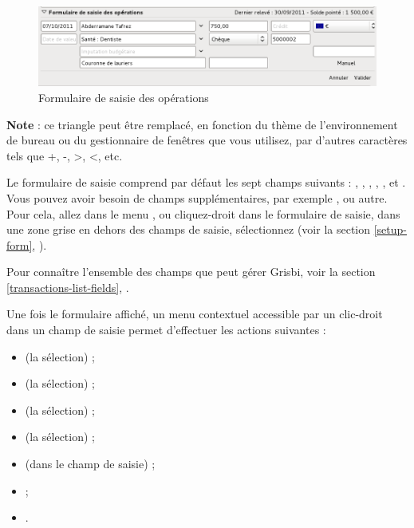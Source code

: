 \ifIllustration
\begin{figure}[htbp]
\begin{center}
\includegraphics[scale=0.5]{image/screenshot/transactions_form}
\end{center}
\caption{Formulaire de saisie des opérations}
\label{transactions-form-img}
\end{figure}
\fi

\textbf{Note} : ce triangle peut être remplacé, en fonction du thème de l'environnement de bureau ou du gestionnaire de fenêtres que vous utilisez, par d'autres caractères tels que +, -, >, <, etc.

Le formulaire de saisie comprend par défaut les sept champs suivants : , , , , ,  et . Vous pouvez avoir besoin de champs supplémentaires, par exemple ,  ou autre. Pour cela, allez dans le menu , ou cliquez-droit dans le formulaire de saisie, dans une zone grise en dehors des champs de saisie, sélectionnez  (voir la section \vref{setup-form}, ).

Pour connaître l'ensemble des champs que peut gérer Grisbi, voir la section \vref{transactions-list-fields}, .

Une fois le formulaire affiché, un menu contextuel accessible par un clic-droit dans un champ de saisie permet d'effectuer les actions suivantes :

\begin{itemize}
	 \item {} (la sélection) ;
	 \item {} (la sélection) ;
	 \item {} (la sélection) ;
	 \item {} (la sélection) ;
	 \item {} (dans le champ de saisie) ;
	 \item {} ;
	 \item {}.
\end{itemize}


